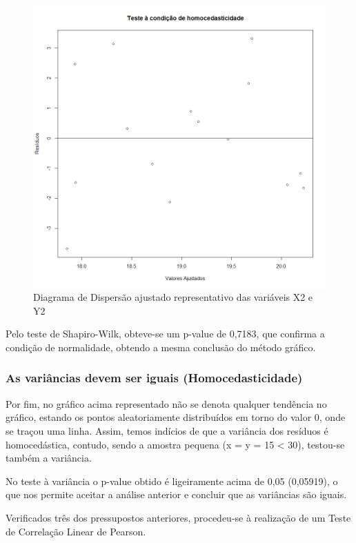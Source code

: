 \documentclass[conference]{IEEEtran}
\begin{document}
\begin{figure}[htbp]
\centerline{\includegraphics[width=0.95\columnwidth]{images/03.b.4.png}}
\caption{Diagrama de Dispersão ajustado representativo das variáveis X2 e Y2}
\label{fig}
\end{figure}

Pelo teste de Shapiro-Wilk, obteve-se um p-value de 0,7183, que confirma a condição de normalidade, obtendo a mesma conclusão do método gráfico.

\subsubsection{As variâncias devem ser iguais (Homocedasticidade)}

Por fim, no gráfico acima representado não se denota qualquer tendência no gráfico, estando os pontos aleatoriamente distribuídos em torno do valor 0, onde se traçou uma linha. Assim, temos indícios de que a variância dos resíduos é homocedástica, contudo, sendo a amostra pequena (x = y = 15 < 30), testou-se também a variância.

No teste à variância o p-value obtido é ligeiramente acima de 0,05 (0,05919), o que nos permite aceitar a análise anterior e concluir que as variâncias são iguais.


Verificados três dos pressupostos anteriores, procedeu-se à realização de um Teste de Correlação Linear de Pearson.
\end{document}
